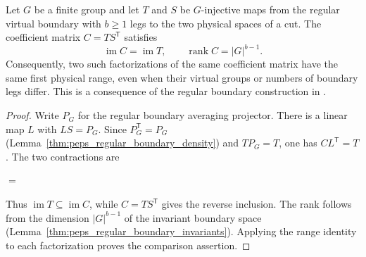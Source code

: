 \begin{lemma}%
    \label{thm:peps_regular_ginjective_cut_range}
    \leanok
    Let $G$ be a finite group and let $T$ and $S$ be $G$-injective
    maps from the regular virtual boundary with $b\geq1$ legs to
    the two physical spaces of a cut. The coefficient matrix
    $C=TS^{\mathsf T}$ satisfies
    \[
        \operatorname{im}C=\operatorname{im}T,
        \qquad \operatorname{rank}C=|G|^{b-1}.
    \]
    Consequently, two such factorizations of the same coefficient
    matrix have the same first physical range, even when their
    virtual groups or numbers of boundary legs differ. This is a
    consequence of the regular boundary construction in
    \cite[Definition~5.1 and proof of Theorem~6.9]{Schuch2010PEPS}.
\end{lemma}

\begin{proof}\leanok
    Write $P_G$ for the regular boundary averaging projector.
    There is a linear map $L$ with $LS=P_G$. Since
    $P_G^{\mathsf T}=P_G$
    (Lemma~\ref{thm:peps_regular_boundary_density}) and $TP_G=T$,
    one has $CL^{\mathsf T}=T$. The two contractions are
    
    \begin{tenkzequation}
        \tenkzkernel
        \begin{tenkz}[rows={wire}, cols=2, bonds=none]
        \end{tenkz}
        $=$
        \begin{tenkz}[rows={wire}, cols=1, bonds=none]
        \end{tenkz}
    \end{tenkzequation}
    Thus $\operatorname{im}T\subseteq\operatorname{im}C$,
    while $C=TS^{\mathsf T}$ gives the reverse
    inclusion. The rank follows from the dimension $|G|^{b-1}$ of the
    invariant boundary space
    (Lemma~\ref{thm:peps_regular_boundary_invariants}). Applying the
    range identity to each factorization proves the comparison assertion.
\end{proof}
